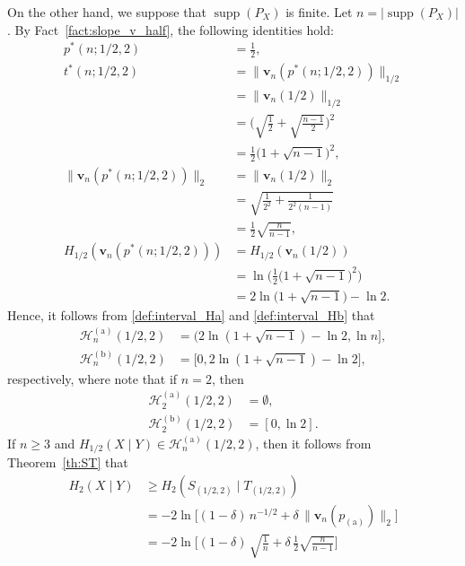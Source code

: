 \documentclass[conference, draftcls, onecolumn]{IEEEtran}
\theoremstyle{plain}
\newcommand{\bvec}[1]{\boldsymbol{#1}}
\newcommand{\supp}{\operatorname{supp}}
\newcommand{\factref}[1]{Fact~\ref{#1}}
\newcommand{\thref}[1]{Theorem~\ref{#1}}
\newcommand{\corref}[1]{Corollary~\ref{#1}}
\begin{document}
\begin{IEEEproof}[Proof of \corref{cor:2_half}]
On the other hand, we suppose that $\supp( P_{X} )$ is finite.
Let $n = |\!\supp( P_{X} )|$.
By \factref{fact:slope_v_half}, the following identities hold:
\begin{align}
p^{\ast}(n; 1/2, 2)
& =
\frac{ 1 }{ 2 } ,
\\
t^{\ast}(n; 1/2, 2)
& =
\| \bvec{v}_{n}( p^{\ast}(n; 1/2, 2) ) \|_{1/2}
\\
& =
\| \bvec{v}_{n}( 1/2 ) \|_{1/2}
\\
& =
\bigg( \sqrt{ \frac{1}{2} } + \sqrt{ \frac{ n-1 }{ 2 } } \bigg)^{2}
\\
& =
\frac{ 1 }{ 2 } \Big( 1 + \sqrt{ n - 1 } \Big)^{2} ,
\\
\| \bvec{v}_{n}( p^{\ast}(n; 1/2, 2) ) \|_{2}
& =
\| \bvec{v}_{n}( 1/2 ) \|_{2}
\\
& =
\sqrt{ \frac{ 1 }{ 2^{2} } + \frac{ 1 }{ 2^{2} (n-1) } }
\\
& =
\frac{ 1 }{ 2 } \sqrt{ \frac{ n }{ n - 1 } } ,
\\
H_{1/2}( \bvec{v}_{n}( p^{\ast}(n; 1/2, 2) ) )
& =
H_{1/2}( \bvec{v}_{n}( 1/2 ) )
\\
& =
\ln \! \bigg( \frac{ 1 }{ 2 } \Big( 1 + \sqrt{ n - 1 } \Big)^{2} \bigg)
\\
& =
2 \ln \Big( 1 + \sqrt{ n - 1 } \Big) - \ln 2 .
\end{align}
Hence, it follows from \eqref{def:interval_Ha} and \eqref{def:interval_Hb} that
\begin{align}
\mathcal{H}_{n}^{(\mathrm{a})}( 1/2, 2 )
& =
\big( 2 \ln ( 1 + \sqrt{ n - 1 } ) - \ln 2, \ln n \big] ,
\\
\mathcal{H}_{n}^{(\mathrm{b})}( 1/2, 2 )
& =
\big[ 0, 2 \ln ( 1 + \sqrt{ n - 1 } ) - \ln 2 \big] ,
\end{align}
respectively, where note that if $n = 2$, then
\begin{align}
\mathcal{H}_{2}^{(\mathrm{a})}( 1/2, 2 )
& =
\emptyset ,
\\
\mathcal{H}_{2}^{(\mathrm{b})}( 1/2, 2 )
& =
[0, \ln 2] .
\end{align}
If $n \ge 3$ and $H_{1/2}(X \mid Y) \in \mathcal{H}_{n}^{(\mathrm{a})}( 1/2, 2 )$, then it follows from \thref{th:ST} that
\begin{align}
H_{2}(X \mid Y)
& \ge
H_{2}(S_{(1/2, 2)} \mid T_{(1/2, 2)})
\\
& =
- 2 \ln \! \Big[ (1-\delta) \, n^{-1/2} + \delta \, \| \bvec{v}_{n}( p_{(\mathrm{a})} ) \|_{2} \Big]
\\
& =
- 2 \ln \! \bigg[ (1-\delta) \, \sqrt{ \frac{ 1 }{ n } } + \delta \, \frac{ 1 }{ 2 } \sqrt{ \frac{ n }{ n - 1 } } \bigg]

\end{align}
\end{IEEEproof}
\end{document}

